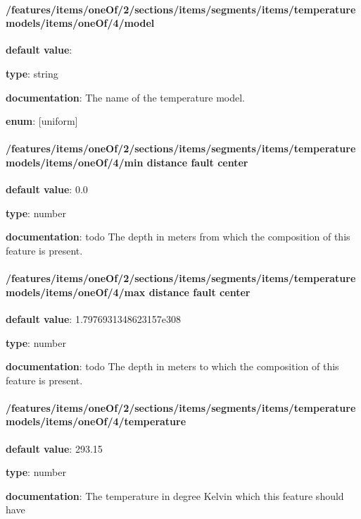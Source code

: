 \paragraph{/features/items/oneOf/2/sections/items/segments/items/temperature models/items/oneOf/4/model} \begin{itemized}
\item {\bf default value}: 
\item {\bf type}: string
\item {\bf documentation}: The name of the temperature model.
\item {\bf enum}: [uniform]\end{itemized}\paragraph{/features/items/oneOf/2/sections/items/segments/items/temperature models/items/oneOf/4/min distance fault center} \begin{itemized}
\item {\bf default value}: 0.0
\item {\bf type}: number
\item {\bf documentation}: todo The depth in meters from which the composition of this feature is present.
\end{itemized}\paragraph{/features/items/oneOf/2/sections/items/segments/items/temperature models/items/oneOf/4/max distance fault center} \begin{itemized}
\item {\bf default value}: 1.7976931348623157e308
\item {\bf type}: number
\item {\bf documentation}: todo The depth in meters to which the composition of this feature is present.
\end{itemized}\paragraph{/features/items/oneOf/2/sections/items/segments/items/temperature models/items/oneOf/4/temperature} \begin{itemized}
\item {\bf default value}: 293.15
\item {\bf type}: number
\item {\bf documentation}: The temperature in degree Kelvin which this feature should have

\end{itemized}
